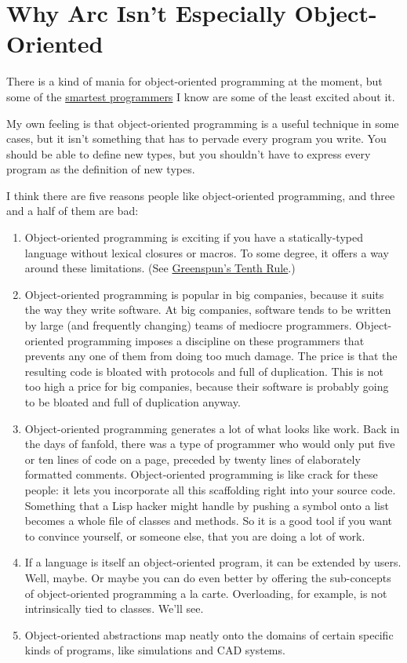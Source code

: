\chapter{Why Arc Isn't Especially Object-Oriented}

There is a kind of mania for object-oriented programming at the moment,
but some of the \href{reesoo.html}{smartest programmers} I know are some
of the least excited about it.

My own feeling is that object-oriented programming is a useful technique
in some cases, but it isn't something that has to pervade every program
you write. You should be able to define new types, but you shouldn't
have to express every program as the definition of new types.

I think there are five reasons people like object-oriented programming,
and three and a half of them are bad:

\begin{enumerate}
\def\labelenumi{\arabic{enumi}.}
\item
  Object-oriented programming is exciting if you have a statically-typed
  language without lexical closures or macros. To some degree, it offers
  a way around these limitations. (See \href{quotes.html}{Greenspun's
  Tenth Rule}.)
\item
  Object-oriented programming is popular in big companies, because it
  suits the way they write software. At big companies, software tends to
  be written by large (and frequently changing) teams of mediocre
  programmers. Object-oriented programming imposes a discipline on these
  programmers that prevents any one of them from doing too much damage.
  The price is that the resulting code is bloated with protocols and
  full of duplication. This is not too high a price for big companies,
  because their software is probably going to be bloated and full of
  duplication anyway.
\item
  Object-oriented programming generates a lot of what looks like work.
  Back in the days of fanfold, there was a type of programmer who would
  only put five or ten lines of code on a page, preceded by twenty lines
  of elaborately formatted comments. Object-oriented programming is like
  crack for these people: it lets you incorporate all this scaffolding
  right into your source code. Something that a Lisp hacker might handle
  by pushing a symbol onto a list becomes a whole file of classes and
  methods. So it is a good tool if you want to convince yourself, or
  someone else, that you are doing a lot of work.
\item
  If a language is itself an object-oriented program, it can be extended
  by users. Well, maybe. Or maybe you can do even better by offering the
  sub-concepts of object-oriented programming a la carte. Overloading,
  for example, is not intrinsically tied to classes. We'll see.
\item
  Object-oriented abstractions map neatly onto the domains of certain
  specific kinds of programs, like simulations and CAD systems.
\end{enumerate}

